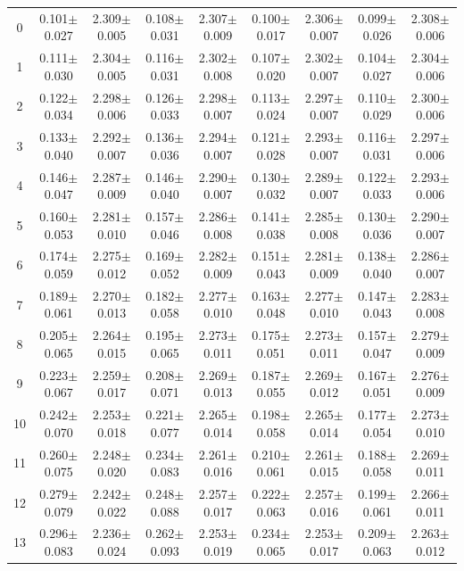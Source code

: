 \begin{table}[H]
{\begin{tabular}{c cc cc cc cc}
0 & 0.101$\pm$0.027 & 2.309$\pm$0.005 & 0.108$\pm$0.031 & 2.307$\pm$0.009 & 0.100$\pm$0.017 & 2.306$\pm$0.007 & 0.099$\pm$0.026 & 2.308$\pm$0.006 \\
1 & 0.111$\pm$0.030 & 2.304$\pm$0.005 & 0.116$\pm$0.031 & 2.302$\pm$0.008 & 0.107$\pm$0.020 & 2.302$\pm$0.007 & 0.104$\pm$0.027 & 2.304$\pm$0.006 \\
2 & 0.122$\pm$0.034 & 2.298$\pm$0.006 & 0.126$\pm$0.033 & 2.298$\pm$0.007 & 0.113$\pm$0.024 & 2.297$\pm$0.007 & 0.110$\pm$0.029 & 2.300$\pm$0.006 \\
3 & 0.133$\pm$0.040 & 2.292$\pm$0.007 & 0.136$\pm$0.036 & 2.294$\pm$0.007 & 0.121$\pm$0.028 & 2.293$\pm$0.007 & 0.116$\pm$0.031 & 2.297$\pm$0.006 \\
4 & 0.146$\pm$0.047 & 2.287$\pm$0.009 & 0.146$\pm$0.040 & 2.290$\pm$0.007 & 0.130$\pm$0.032 & 2.289$\pm$0.007 & 0.122$\pm$0.033 & 2.293$\pm$0.006 \\
5 & 0.160$\pm$0.053 & 2.281$\pm$0.010 & 0.157$\pm$0.046 & 2.286$\pm$0.008 & 0.141$\pm$0.038 & 2.285$\pm$0.008 & 0.130$\pm$0.036 & 2.290$\pm$0.007 \\
6 & 0.174$\pm$0.059 & 2.275$\pm$0.012 & 0.169$\pm$0.052 & 2.282$\pm$0.009 & 0.151$\pm$0.043 & 2.281$\pm$0.009 & 0.138$\pm$0.040 & 2.286$\pm$0.007 \\
7 & 0.189$\pm$0.061 & 2.270$\pm$0.013 & 0.182$\pm$0.058 & 2.277$\pm$0.010 & 0.163$\pm$0.048 & 2.277$\pm$0.010 & 0.147$\pm$0.043 & 2.283$\pm$0.008 \\
8 & 0.205$\pm$0.065 & 2.264$\pm$0.015 & 0.195$\pm$0.065 & 2.273$\pm$0.011 & 0.175$\pm$0.051 & 2.273$\pm$0.011 & 0.157$\pm$0.047 & 2.279$\pm$0.009 \\
9 & 0.223$\pm$0.067 & 2.259$\pm$0.017 & 0.208$\pm$0.071 & 2.269$\pm$0.013 & 0.187$\pm$0.055 & 2.269$\pm$0.012 & 0.167$\pm$0.051 & 2.276$\pm$0.009 \\
10 & 0.242$\pm$0.070 & 2.253$\pm$0.018 & 0.221$\pm$0.077 & 2.265$\pm$0.014 & 0.198$\pm$0.058 & 2.265$\pm$0.014 & 0.177$\pm$0.054 & 2.273$\pm$0.010 \\
11 & 0.260$\pm$0.075 & 2.248$\pm$0.020 & 0.234$\pm$0.083 & 2.261$\pm$0.016 & 0.210$\pm$0.061 & 2.261$\pm$0.015 & 0.188$\pm$0.058 & 2.269$\pm$0.011 \\
12 & 0.279$\pm$0.079 & 2.242$\pm$0.022 & 0.248$\pm$0.088 & 2.257$\pm$0.017 & 0.222$\pm$0.063 & 2.257$\pm$0.016 & 0.199$\pm$0.061 & 2.266$\pm$0.011 \\
13 & 0.296$\pm$0.083 & 2.236$\pm$0.024 & 0.262$\pm$0.093 & 2.253$\pm$0.019 & 0.234$\pm$0.065 & 2.253$\pm$0.017 & 0.209$\pm$0.063 & 2.263$\pm$0.012 \\

\end{tabular}}
\end{table}
